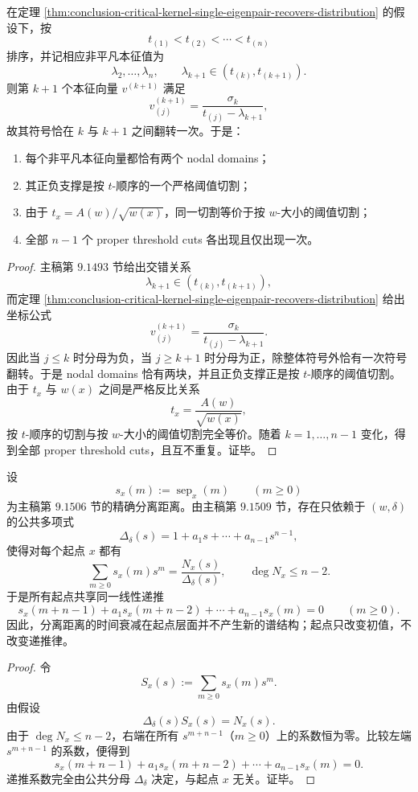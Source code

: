\begin{corollary}[非平凡本征向量的阈值切割全图册]\label{cor:conclusion-critical-kernel-threshold-nodal-atlas}
在定理 \ref{thm:conclusion-critical-kernel-single-eigenpair-recovers-distribution} 的假设下，按
\[
t_{(1)}<t_{(2)}<\cdots<t_{(n)}
\]
排序，并记相应非平凡本征值为
\[
\lambda_2,\dots,\lambda_n,
\qquad
\lambda_{k+1}\in (t_{(k)},t_{(k+1)}).
\]
则第 \(k+1\) 个本征向量 \(v^{(k+1)}\) 满足
\[
v^{(k+1)}_{(j)}=\frac{\sigma_k}{t_{(j)}-\lambda_{k+1}},
\]
故其符号恰在 \(k\) 与 \(k+1\) 之间翻转一次。于是：
\begin{enumerate}
  \item 每个非平凡本征向量都恰有两个 nodal domains；
  \item 其正负支撑是按 \(t\)-顺序的一个严格阈值切割；
  \item 由于 \(t_x=A(w)/\sqrt{w(x)}\)，同一切割等价于按 \(w\)-大小的阈值切割；
  \item 全部 \(n-1\) 个 proper threshold cuts 各出现且仅出现一次。
\end{enumerate}
\end{corollary}
\begin{proof}
主稿第 \(9.1493\) 节给出交错关系
\[
\lambda_{k+1}\in (t_{(k)},t_{(k+1)}),
\]
而定理 \ref{thm:conclusion-critical-kernel-single-eigenpair-recovers-distribution} 给出坐标公式
\[
v^{(k+1)}_{(j)}=\frac{\sigma_k}{t_{(j)}-\lambda_{k+1}}.
\]
因此当 \(j\le k\) 时分母为负，当 \(j\ge k+1\) 时分母为正，除整体符号外恰有一次符号翻转。于是 nodal domains 恰有两块，并且正负支撑正是按 \(t\)-顺序的阈值切割。
由于 \(t_x\) 与 \(w(x)\) 之间是严格反比关系
\[
t_x=\frac{A(w)}{\sqrt{w(x)}},
\]
按 \(t\)-顺序的切割与按 \(w\)-大小的阈值切割完全等价。随着 \(k=1,\dots,n-1\) 变化，得到全部 proper threshold cuts，且互不重复。证毕。
\end{proof}

\begin{theorem}[分离距离的起点无关线性递推]\label{thm:conclusion-critical-kernel-separation-common-recurrence}
设
\[
s_x(m):=\operatorname{sep}_x(m)\qquad(m\ge 0)
\]
为主稿第 \(9.1506\) 节的精确分离距离。由主稿第 \(9.1509\) 节，存在只依赖于 \((w,\delta)\) 的公共多项式
\[
\Delta_\delta(s)=1+a_1 s+\cdots+a_{n-1}s^{n-1},
\]
使得对每个起点 \(x\) 都有
\[
\sum_{m\ge 0}s_x(m)s^m=\frac{N_x(s)}{\Delta_\delta(s)},
\qquad
\deg N_x\le n-2.
\]
于是所有起点共享同一线性递推
\[
s_x(m+n-1)+a_1 s_x(m+n-2)+\cdots+a_{n-1}s_x(m)=0
\qquad(m\ge 0).
\]
因此，分离距离的时间衰减在起点层面并不产生新的谱结构；起点只改变初值，不改变递推律。
\end{theorem}
\begin{proof}
令
\[
S_x(s):=\sum_{m\ge 0}s_x(m)s^m.
\]
由假设
\[
\Delta_\delta(s)S_x(s)=N_x(s).
\]
由于 \(\deg N_x\le n-2\)，右端在所有 \(s^{m+n-1}\)（\(m\ge 0\)）上的系数恒为零。比较左端 \(s^{m+n-1}\) 的系数，便得到
\[
s_x(m+n-1)+a_1 s_x(m+n-2)+\cdots+a_{n-1}s_x(m)=0.
\]
递推系数完全由公共分母 \(\Delta_\delta\) 决定，与起点 \(x\) 无关。证毕。
\end{proof}

